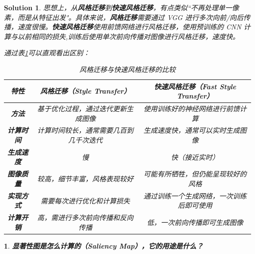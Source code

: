 \documentclass{article}
\theoremstyle{Problem}
\newtheorem{prob}{}
\theoremstyle{Solution}
\newtheorem*{sol}{Solution}
\begin{document}
	\begin{sol}
		思想上，从\textbf{风格迁移}到\textbf{快速风格迁移}，有点类似``不再处理单一像素，而是从特征出发"。具体来说，\textbf{风格迁移}需要通过 VGG 进行多次向前/向后传播，速度很慢。\textbf{快速风格迁移}使用前馈网络进行风格迁移，使用预训练的 CNN 计算与以前相同的损失,训练后使用单次前向传播对图像进行风格迁移，速度快。
		
		通过表\ref{table}可以直观看出区别：
		\begin{table}[h!]
			\centering
			\begin{tabular}{|c|c|c|}
				\hline
				\textbf{特性} & \textbf{风格迁移（Style Transfer）} & \textbf{快速风格迁移（Fast Style Transfer）} \\
				\hline
				\textbf{方法} & 基于优化过程，通过迭代更新生成图像 & 使用训练好的神经网络进行前馈计算 \\
				\hline
				\textbf{计算时间} & 计算时间较长，通常需要几百到几千次迭代 & 生成速度快，通常可以实时生成图像 \\
				\hline
				\textbf{生成速度} & 慢 & 快（接近实时） \\
				\hline
				\textbf{图像质量} & 较高，细节丰富，风格表现较好 & 可能有所牺牲，但仍能呈现较好的风格 \\
				\hline
				\textbf{实现方式} & 需要每次进行优化和计算损失 & 通过训练一个生成网络，一次训练后即可使用 \\
				\hline
				\textbf{计算开销} & 高，需进行多次前向传播和反向传播 & 低，一次前向传播即可生成图像 \\
				\hline
			\end{tabular}
			\caption{风格迁移与快速风格迁移的比较}
			\label{table}
		\end{table}
	\end{sol}
	

	\begin{prob}
		\textbf{显著性图是怎么计算的（Saliency Map），它的用途是什么？}
	\end{prob}
	
\end{document}
